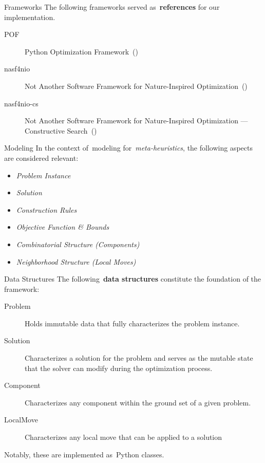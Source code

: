 \begin{frame}{ Frameworks}
  The following frameworks served as~\textbf{references} for our implementation.

  \begin{description}
    \item[POF] Python Optimization Framework~(\cite{vieira2009uma})
    \item[nasf4nio] Not Another Software Framework for Nature-Inspired Optimization~(\cite{fonseca2021nasf4nio})
    \item[nasf4nio-cs] Not Another Software Framework for Nature-Inspired Optimization --- Constructive Search~(\cite{outeiro2021application})
  \end{description}
\end{frame}

\begin{frame}{Modeling}
  In the context of~\alert{modeling} for~\emph{meta-heuristics}, the following aspects are
  considered relevant:
  \begin{itemize}
    \item \emph{Problem Instance}
    \item \emph{Solution}
    \item \emph{Construction Rules}
    \item \emph{Objective Function \& Bounds}
    \item \emph{Combinatorial Structure (Components)}
    \item \emph{Neighborhood Structure (Local Moves)}
  \end{itemize}
\end{frame}

\begin{frame}{Data Structures}
  The following~\textbf{data structures} constitute the foundation of the framework:

  \begin{description}
    \item[Problem] Holds immutable data that fully characterizes the problem instance.

    \item[Solution] Characterizes a solution for the problem and serves as the mutable state that
      the solver can modify during the optimization process.

    \item[Component] Characterizes any component within the ground set of a given problem.

    \item[LocalMove] Characterizes any local move that can be applied to a solution
  \end{description}

  Notably, these are implemented as~\alert{Python classes}.
\end{frame}

